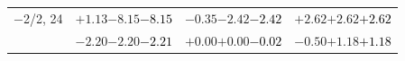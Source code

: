 \documentclass[compress]{beamer}
\begin{document}
\begin{frame}
\begin{tabular}{r | c | c | c}
$-$2/2, 24 & $+1.13$\hspace{0.1 cm}$-8.15$\hspace{0.1 cm}\textcolor{black}{$-8.15$} & $-0.35$\hspace{0.1 cm}$-2.42$\hspace{0.1 cm}\textcolor{black}{$-2.42$} & $+2.62$\hspace{0.1 cm}$+2.62$\hspace{0.1 cm}\textcolor{black}{$+2.62$} \\
           & $-2.20$\hspace{0.1 cm}$-2.20$\hspace{0.1 cm}\textcolor{black}{$-2.21$} & $+0.00$\hspace{0.1 cm}$+0.00$\hspace{0.1 cm}\textcolor{black}{$-0.02$} & $-0.50$\hspace{0.1 cm}$+1.18$\hspace{0.1 cm}\textcolor{black}{$+1.18$} \\
\end{tabular}
\end{frame}
\end{document}
